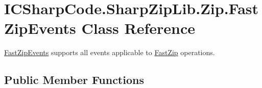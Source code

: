\hypertarget{class_i_c_sharp_code_1_1_sharp_zip_lib_1_1_zip_1_1_fast_zip_events}{}\section{I\+C\+Sharp\+Code.\+Sharp\+Zip\+Lib.\+Zip.\+Fast\+Zip\+Events Class Reference}
\label{class_i_c_sharp_code_1_1_sharp_zip_lib_1_1_zip_1_1_fast_zip_events}


\hyperlink{class_i_c_sharp_code_1_1_sharp_zip_lib_1_1_zip_1_1_fast_zip_events}{Fast\+Zip\+Events} supports all events applicable to \hyperlink{class_i_c_sharp_code_1_1_sharp_zip_lib_1_1_zip_1_1_fast_zip}{Fast\+Zip} operations.  


\subsection*{Public Member Functions}
